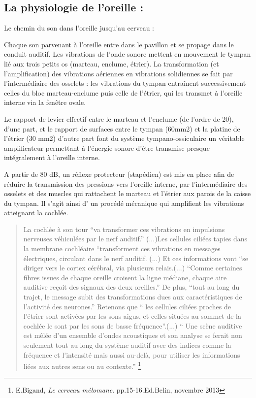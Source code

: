 \subsection{La physiologie de l'oreille : }

Le chemin du son dans l'oreille jusqu'au cerveau : 

Chaque son parvenant à l'oreille entre dans le pavillon et se propage
dans le conduit auditif. Les vibrations de l'onde sonore mettent en
mouvement le tympan lié aux trois petits os (marteau, enclume, étrier).
La transformation (et l\textquoteright amplification) des vibrations
aériennes en vibrations solidiennes se fait par l\textquoteright intermédiaire
des osselets : les vibrations du tympan entraînent successivement
celles du bloc marteau-enclume puis celle de l\textquoteright étrier,
qui les transmet à l\textquoteright oreille interne via la fenêtre
ovale.

Le rapport de levier effectif entre le marteau et l\textquoteright enclume
(de l\textquoteright ordre de 20), d\textquoteright une part, et le
rapport de surfaces entre le tympan (60mm2) et la platine de l\textquoteright étrier
(30 mm2) d\textquoteright autre part font du système tympano-ossiculaire
un véritable amplificateur permettant à l\textquoteright énergie sonore
d\textquoteright être transmise presque intégralement à l\textquoteright oreille
interne.

A partir de 80 dB, un réflexe protecteur (stapédien) est mis en place
afin de réduire la transmission des pressions vers l\textquoteright oreille
interne, par l\textquoteright intermédiaire des osselets et des muscles
qui rattachent le marteau et l\textquoteright étrier aux parois de
la caisse du tympan. Il s'agit ainsi d' un procédé mécanique qui amplifient
les vibrations atteignant la cochlée. 
\begin{quotation}
La cochlée à son tour ``va transformer ces vibrations en impulsions
nerveuses véhiculées par le nerf auditif.'' (...)Les cellules ciliées
tapies dans la membrane cochléaire ``transforment ces vibrations
en messages électriques, circulant dans le nerf auditif. (...) Et
ces informations vont ``se diriger vers le cortex cérébral, via plusieurs
relais.(...) ``Comme certaines fibres issues de chaque oreille croisent
la ligne médiane, chaque aire auditive reçoit des signaux des deux
oreilles.'' De plus, ``tout au long du trajet, le message subit
des transformations dues aux caractéristiques de l'activité des neurones.''
Retenons que `` les cellules ciliées proches de l'étrier sont activées
par les sons aigus, et celles situées au sommet de la cochlée le sont
par les sons de basse fréquence''.(...) `` Une scène auditive est
mêlée d'un ensemble d'ondes acoustiques et son analyse se ferait non
seulement tout au long du système auditif avec des indices comme la
fréquence et l'intensité mais aussi au-delà, pour utiliser les informations
liées aux autres sens ou au contexte.'' \footnote{E.Bigand,\emph{ Le cerveau mélomane}. pp.15-16.Ed.Belin, novembre
2013}
\end{quotation}

